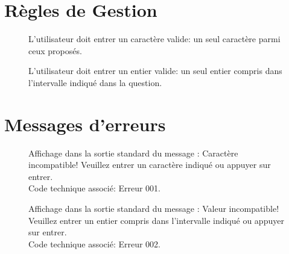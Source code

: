 \documentclass[12pt,a4paper]{article}
\begin{document}
	\section{Règles de Gestion}

\begin{figure}[H]
	   \caption{
	    	\label{R1} %
	    	L'utilisateur doit entrer un caractère valide: un seul caractère parmi ceux proposés.
	   }
\end{figure}

\begin{figure}[H]
	   \caption{
	    	\label{R2} %
	    	L'utilisateur doit entrer un entier valide: un seul entier compris dans l'intervalle indiqué dans la question.
	    }
	\end{figure}

	\section{Messages d'erreurs}

\begin{figure}[H]
	   \caption{
	    	\label{E1} %
	    	Affichage dans la sortie standard du message : Caractère incompatible! Veuillez entrer un caractère indiqué ou appuyer sur entrer. \\
	    	Code technique associé: Erreur 001.
		   }
	\end{figure}

	 \begin{figure}[H]
	   \caption{
	    	\label{E2} %
	    	Affichage dans la sortie standard du message : Valeur incompatible! Veuillez entrer un entier compris dans l'intervalle indiqué ou appuyer sur entrer. \\
	    	Code technique associé: Erreur 002.
	    }
	\end{figure}
\end{document}
